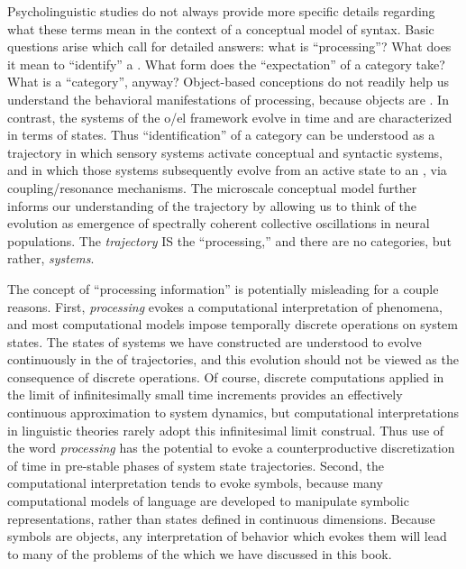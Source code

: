 Psycholinguistic studies do not always provide more specific details regarding what these terms mean in the context of a conceptual model of syntax. Basic questions arise which call for detailed answers: what is “processing”? What does it mean to “identify” a . What form does the “expectation” of a category take? What is a “category”, anyway? Object-based conceptions do not readily help us understand the behavioral manifestations of processing, because objects are . In contrast, the systems of the o/el framework evolve in time and are characterized in terms of states. Thus “identification” of a category can be understood as a  trajectory in which sensory systems activate conceptual and syntactic systems, and in which those systems subsequently evolve from an active state to an , via coupling/resonance mechanisms. The microscale conceptual model further informs our understanding of the trajectory by allowing us to think of the evolution as emergence of spectrally coherent collective oscillations in neural populations. The \textit{trajectory} IS the “processing,” and there are no categories, but rather, \textit{systems}.

The concept of “processing information” is potentially misleading for a couple reasons. First, \textit{processing} evokes a computational interpretation of phenomena, and most computational models impose temporally discrete operations on system states. The states of systems we have constructed are understood to evolve continuously in the  of trajectories, and this evolution should not be viewed as the consequence of discrete operations. Of course, discrete computations applied in the limit of infinitesimally small time increments provides an effectively continuous approximation to system dynamics, but computational interpretations in linguistic theories rarely adopt this infinitesimal limit construal. Thus use of the word \textit{processing} has the potential to evoke a counterproductive discretization of time in pre-stable phases of system state trajectories. Second, the computational interpretation tends to evoke symbols, because many computational models of language are developed to manipulate symbolic representations, rather than states defined in continuous dimensions. Because symbols are objects, any interpretation of behavior which evokes them will lead to many of the problems of the  which we have discussed in this book. 


